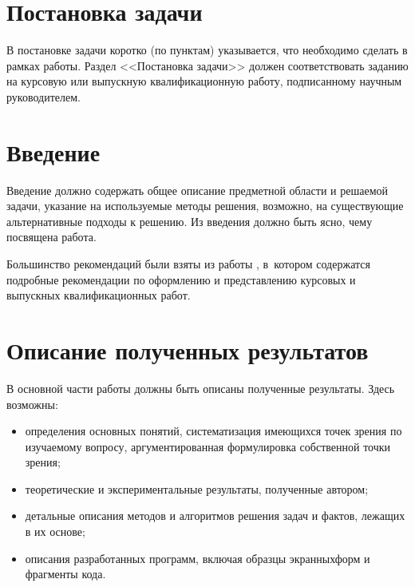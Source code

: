 \documentclass[14pt]{mmcs_article}
\begin{document}

\renewcommand{\contentsname}{Оглавление}

\tableofcontents

\newpage
{}

\section*{Постановка задачи}


В постановке задачи коротко (по пунктам) указывается, что необходимо сделать в рамках работы. Раздел <<Постановка задачи>> должен соответствовать заданию на курсовую или выпускную квалификационную работу, подписанному научным руководителем.


\newpage
{}
\section*{Введение}

Введение должно содержать общее описание предметной области и решаемой задачи, указание на используемые методы решения, возможно, на существующие альтернативные подходы к решению. Из введения должно быть ясно, чему посвящена работа.

Большинство рекомендаций были взяты из работы \cite{stud:b0}, в~котором
содержатся подробные рекомендации по оформлению
и представлению курсовых
и выпускных квалификационных работ.




\newpage
\section{Описание полученных результатов}\label{dsfs}

В основной части работы должны быть описаны полученные результаты. Здесь возможны:
\begin{itemize}
\item определения основных понятий, систематизация имеющихся точек зрения по изучаемому вопросу, аргументированная формулировка собственной точки зрения;
\item теоретические и экспериментальные результаты, полученные автором;
\item детальные описания методов и алгоритмов решения задач и фактов, лежащих в их основе;
\item описания разработанных программ, включая образцы экранных\linebreak форм и фрагменты кода.
\end{itemize}
\end{document}
